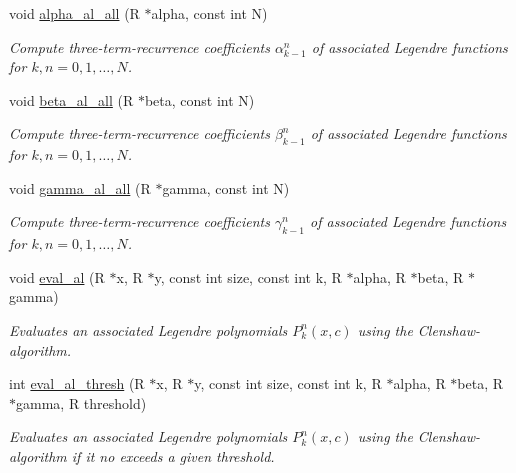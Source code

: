 \begin{CompactItemize}
\item 
void \hyperlink{group__nfsft_g6b01d5f2e8b3a026906e977118d7b0d2}{alpha\_\-al\_\-all} (R $\ast$alpha, const int N)
\begin{CompactList}\small\item\em Compute three-term-recurrence coefficients $\alpha_{k-1}^n$ of associated Legendre functions for $k,n = 0,1,\ldots,N$. \item\end{CompactList}\item 
void \hyperlink{group__nfsft_gf0fb6a3993b3c956bea8fa75e3a71290}{beta\_\-al\_\-all} (R $\ast$beta, const int N)
\begin{CompactList}\small\item\em Compute three-term-recurrence coefficients $\beta_{k-1}^n$ of associated Legendre functions for $k,n = 0,1,\ldots,N$. \item\end{CompactList}\item 
void \hyperlink{group__nfsft_g88de851c8f9a4c042ad101cb4fb8c51d}{gamma\_\-al\_\-all} (R $\ast$gamma, const int N)
\begin{CompactList}\small\item\em Compute three-term-recurrence coefficients $\gamma_{k-1}^n$ of associated Legendre functions for $k,n = 0,1,\ldots,N$. \item\end{CompactList}\item 
void \hyperlink{group__nfsft_gc5f2f8c36dc4f8ca65f058af6491f163}{eval\_\-al} (R $\ast$x, R $\ast$y, const int size, const int k, R $\ast$alpha, R $\ast$beta, R $\ast$gamma)
\begin{CompactList}\small\item\em Evaluates an associated Legendre polynomials $P_k^n(x,c)$ using the Clenshaw-algorithm. \item\end{CompactList}\item 
int \hyperlink{group__nfsft_g1bc5682379de94e87031afa38e02675d}{eval\_\-al\_\-thresh} (R $\ast$x, R $\ast$y, const int size, const int k, R $\ast$alpha, R $\ast$beta, R $\ast$gamma, R threshold)
\begin{CompactList}\small\item\em Evaluates an associated Legendre polynomials $P_k^n(x,c)$ using the Clenshaw-algorithm if it no exceeds a given threshold. \item\end{CompactList}\item 

\end{CompactItemize}
